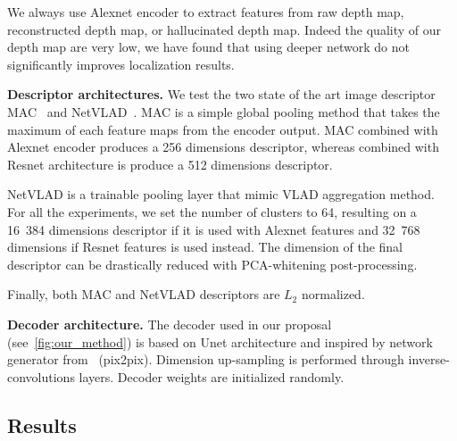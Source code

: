 We always use Alexnet encoder to extract features from raw depth map, reconstructed depth map, or hallucinated depth map. Indeed the quality of our depth map are very low, we have found that using deeper network do not significantly improves localization results.

\noindent\textbf{Descriptor architectures.} We test the two state of the art image descriptor MAC~\cite{Radenovic2017} and NetVLAD~\cite{Arandjelovic2017}. MAC is a simple global pooling method that takes the maximum of each feature maps from the encoder output. MAC combined with Alexnet encoder produces a 256 dimensions descriptor, whereas combined with Resnet architecture is produce a 512 dimensions descriptor.

NetVLAD is a trainable pooling layer that mimic VLAD aggregation method. For all the experiments, we set the number of clusters to 64, resulting on a 16~384 dimensions descriptor if it is used with Alexnet features and 32~768 dimensions if Resnet features is used instead. The dimension of the final descriptor can be drastically reduced with PCA-whitening post-processing.

Finally, both MAC and NetVLAD descriptors are $L_{2}$ normalized.

\noindent\textbf{Decoder architecture.} The decoder used in our proposal (see~\ref{fig:our_method}) is based on Unet architecture and inspired by network generator from~\cite{} (pix2pix). Dimension up-sampling is performed through inverse-convolutions layers. Decoder weights are initialized randomly.

\subsection{Results}
\label{subsec:results}

